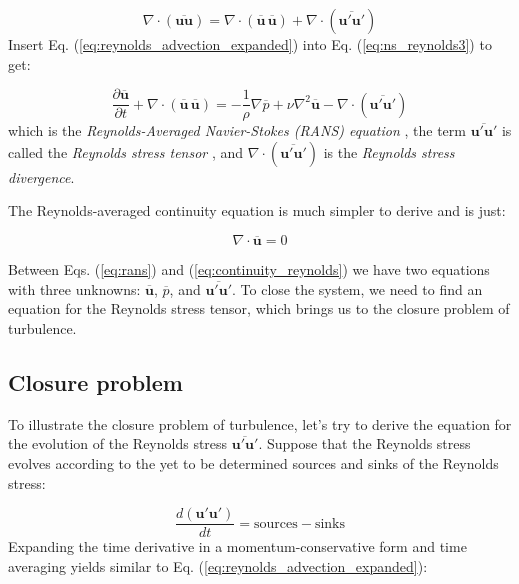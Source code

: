 \documentclass[12pt]{article}
\numberwithin{equation}{section}
\numberwithin{figure}{section}
\numberwithin{table}{section}
\begin{document}
\begin{equation}
  \nabla \cdot (\overline{\mathbf{u} \mathbf{u}}) =
  \nabla \cdot (\overline{\mathbf{u}}\, \overline{\mathbf{u}}) + \nabla \cdot (\overline{\mathbf{u}' \mathbf{u}'})
  \label{eq:reynolds_advection_expanded}
\end{equation}
Insert Eq. (\ref{eq:reynolds_advection_expanded}) into Eq. (\ref{eq:ns_reynolds3}) to get:

\begin{equation}
  \frac{\partial \overline{\mathbf{u}}}{\partial t} +
  \nabla \cdot (\overline{\mathbf{u}}\, \overline{\mathbf{u}}) =
  - \frac{1}{\rho} \nabla \overline{p} +
  \nu \nabla^2 \overline{\mathbf{u}}
  - \nabla \cdot (\overline{\mathbf{u}' \mathbf{u}'})
  \label{eq:rans}
\end{equation}
which is the \textit{Reynolds-Averaged Navier-Stokes (RANS) equation}
, the term
$\overline{\mathbf{u}' \mathbf{u}'}$ is called the \textit{Reynolds stress tensor}
,
and $\nabla \cdot (\overline{\mathbf{u}' \mathbf{u}'})$ is the
\textit{Reynolds stress divergence}.

The Reynolds-averaged continuity equation is much simpler to derive and is
just:

\begin{equation}
  \nabla \cdot \overline{\mathbf{u}} = 0
  \label{eq:continuity_reynolds}
\end{equation}

Between Eqs. (\ref{eq:rans}) and (\ref{eq:continuity_reynolds}) we have
two equations with three unknowns: $\overline{\mathbf{u}}$, $\overline{p}$, and
$\overline{\mathbf{u}' \mathbf{u}'}$.
To close the system, we need to find an equation for the Reynolds stress tensor,
which brings us to the closure problem of turbulence.

\subsection{Closure problem}

To illustrate the closure problem of turbulence, let's try to derive the
equation for the evolution of the Reynolds stress $\overline{\mathbf{u}' \mathbf{u}'}$.
Suppose that the Reynolds stress evolves according to the yet to be determined
sources and sinks of the Reynolds stress:

\begin{equation}
  \frac{d \left( \mathbf{u}' \mathbf{u}' \right)}{dt} =
  \text{sources} - \text{sinks}
  \label{eq:reynolds_stress_evolution}
\end{equation}
Expanding the time derivative in a momentum-conservative form and time averaging
yields similar to Eq. (\ref{eq:reynolds_advection_expanded}):
\end{document}
